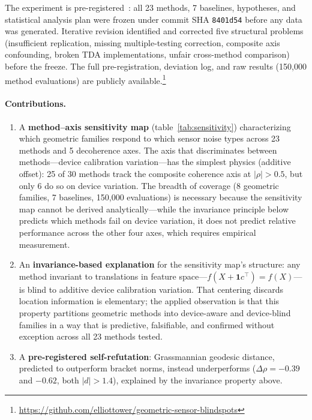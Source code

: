 \documentclass[11pt]{article}
\begin{document}
The experiment is
pre-registered~\citep{nosek2018preregistration,simmons2011false}: all
23 methods, 7 baselines, hypotheses, and statistical analysis plan were
frozen under commit SHA
\texttt{8401d54} before any data was generated.  Iterative revision identified and corrected five structural problems
(insufficient replication, missing multiple-testing correction, composite
axis confounding, broken TDA implementations, unfair cross-method
comparison) before the freeze.  The full pre-registration, deviation
log, and raw results (150,000 method evaluations) are publicly
available.\footnote{\url{https://github.com/elliottower/geometric-sensor-blindspots}}

\paragraph{Contributions.}
\begin{enumerate}
  \item A \textbf{method--axis sensitivity map} (table~\ref{tab:sensitivity})
    characterizing which geometric families respond to which sensor noise
    types across 23 methods and 5 decoherence axes.  The axis that
    discriminates between methods---device calibration variation---has the
    simplest physics (additive offset): 25 of 30 methods track the
    composite coherence axis at $|\rho| > 0.5$, but only 6 do so on
    device variation.  The breadth of coverage (8 geometric families, 7
    baselines, 150,000 evaluations) is necessary because the sensitivity
    map cannot be derived analytically---while the invariance principle
    below predicts which methods fail on device variation, it does not
    predict relative performance across the other four axes, which
    requires empirical measurement.
  \item An \textbf{invariance-based explanation} for the sensitivity
    map's structure: any method invariant to translations in feature
    space---$f(X + \mathbf{1}c^\top) = f(X)$---is blind to additive
    device calibration variation.  That centering discards location
    information is elementary; the applied observation is that this
    property partitions geometric methods into device-aware and
    device-blind families in a way that is predictive, falsifiable, and
    confirmed without exception across all 23 methods tested.
  \item A \textbf{pre-registered self-refutation}: Grassmannian geodesic
    distance, predicted to outperform bracket norms, instead
    underperforms ($\Delta\rho = -0.39$ and $-0.62$, both $|d| > 1.4$),
    explained by the invariance property above.
\end{enumerate}
\end{document}
